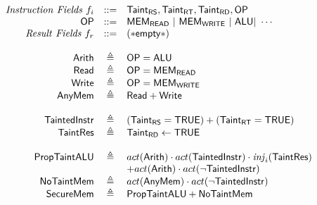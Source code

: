 \documentclass[12pt, letterpaper]{article}
\begin{document}
  \[
  \begin{array}{r c l}
    \mathit{Instruction\ Fields}\ f_i &::=& \mathsf{Taint_{RS}}, \mathsf{Taint_{RT}}, \mathsf{Taint_{RD}}, \mathsf{OP}\\
    \mathsf{OP} &::=& \mathsf{MEM_{READ}}\ |\ \mathsf{MEM_{WRITE}}\ |\ \mathsf{ALU} |\ \cdots \\
    \mathit{Result\ Fields}\ f_r &::=& \mathsf{(*empty*)}\\\\

    \mathsf{Arith}   &\triangleq& \mathsf{OP} = \mathsf{ALU}\\
    \mathsf{Read}    &\triangleq& \mathsf{OP} = \mathsf{MEM_{READ}}\\
    \mathsf{Write}   &\triangleq& \mathsf{OP} = \mathsf{MEM_{WRITE}}\\
    \mathsf{AnyMem}  &\triangleq& \mathsf{Read} + \mathsf{Write}\\\\

    \mathsf{TaintedInstr} &\triangleq& ( \mathsf{Taint_{RS}} = \mathsf{TRUE} ) + ( \mathsf{Taint_{RT}} = \mathsf{TRUE} )\\
    \mathsf{TaintRes}     &\triangleq& \mathsf{Taint_{RD}} \leftarrow \mathsf{TRUE}\\\\

    \mathsf{PropTaintALU} &\triangleq&
      act(\mathsf{Arith})\cdot act(\mathsf{TaintedInstr})\cdot \mathit{inj}_{i}(\mathsf{TaintRes})\\
      &&+
      act(\mathsf{Arith})\cdot act(\neg \mathsf{TaintedInstr})\\
    \mathsf{NoTaintMem} &\triangleq&
      act(\mathsf{AnyMem})\cdot act(\neg \mathsf{TaintedInstr})\\
    \mathsf{SecureMem} &\triangleq& \mathsf{PropTaintALU} + \mathsf{NoTaintMem}
  \end{array}
  \]\\
\end{document}
